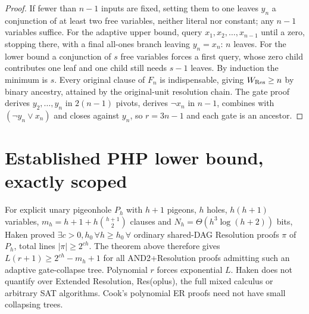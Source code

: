 \documentclass{article}
\begin{document}
\begin{proof} If fewer than $n-1$ inputs are fixed, setting them to one leaves $y_n$ a conjunction of at least two free variables, neither literal nor constant; any $n-1$ variables suffice. For the adaptive upper bound, query $x_1,x_2,\dots,x_{n-1}$ until a zero, stopping there, with a final all-ones branch leaving $y_n=x_n$: $n$ leaves. For the lower bound a conjunction of $s$ free variables forces a first query, whose zero child contributes one leaf and one child still needs $s-1$ leaves. By induction the minimum is $s$. Every original clause of $F_n$ is indispensable, giving $W_{\rm Res}\ge n$ by binary ancestry, attained by the original-unit resolution chain. The gate proof derives $y_2,\dots,y_n$ in $2(n-1)$ pivots, derives $\neg x_n$ in $n-1$, combines with $(\neg y_n\lor x_n)$ and closes against $y_n$, so $r=3n-1$ and each gate is an ancestor. \end{proof}
\section*{Established PHP lower bound, exactly scoped}
For explicit unary pigeonhole $P_h$ with $h+1$ pigeons, $h$ holes, $h(h+1)$ variables, $m_h=h+1+h\binom{h+1}{2}$ clauses and $N_h=\Theta(h^3\log(h+2))$ bits, Haken proved $\exists c>0,h_0\,\forall h\ge h_0\,\forall$ ordinary shared-DAG Resolution proofs $\pi$ of $P_h$, total lines $|\pi|\ge 2^{ch}$. The theorem above therefore gives $L(r+1)\ge2^{ch}-m_h+1$ for all AND2+Resolution proofs admitting such an adaptive gate-collapse tree. Polynomial $r$ forces exponential $L$. Haken does not quantify over Extended Resolution, Res(oplus), the full mixed calculus or arbitrary SAT algorithms. Cook's polynomial ER proofs need not have small collapsing trees.
\end{document}
